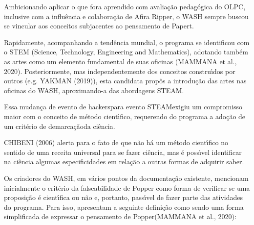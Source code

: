 \documentclass[
12pt,		%
openright,	%
twoside,  %
a4paper,			%
chapter=TITLE,		%
english,			%
french,				%
spanish,			%
brazil				%
]{USPSC-classe/USPSC}
\begin{document}
Ambicionando aplicar o que fora aprendido com avalia\c{c}\~ao pedag\'ogica do OLPC, inclusive com a influ\^encia e colabora\c{c}\~ao de Afira Ripper, o WASH sempre buscou se vincular aos conceitos subjacentes ao pensamento de Papert.









Rapidamente, acompanhando a tend\^encia mundial, o programa se identificou com o STEM (Science, Technology, Engineering and Mathematics), adotando tamb\'em as artes como um elemento fundamental de suas oficinas  (MAMMANA et al., 2020). Posteriormente, mas independentemente dos conceitos constru\'{\i}dos por outros (e.g.  YAKMAN (2019)), esta candidata prop\^os a introdu\c{c}\~ao das artes nas oficinas do WASH, aproximando-a das abordagens STEAM.









Essa mudan\c{c}a de \textquotedbl evento de hackers\textquotedbl  para \textquotedbl evento STEAM\textquotedbl  exigiu um compromisso maior com o conceito de m\'etodo cient\'{\i}fico, requerendo do programa a ado\c{c}\~ao de um \textquotedbl crit\'erio de demarca\c{c}\~ao\textquotedbl  da ci\^encia.









 CHIBENI (2006) alerta para o fato de que \textquotedbl n\~ao h\'a um m\'etodo cient\'{\i}fico no sentido de uma receita universal para se fazer ci\^encia\textquotedbl , mas \'e poss\'{\i}vel identificar na ci\^encia algumas especificidades em rela\c{c}\~ao a outras formas de adquirir saber.









Os criadores do WASH, em v\'arios pontos da documenta\c{c}\~ao existente, mencionam inicialmente o crit\'erio da falseabilidade de Popper como forma de verificar se uma proposi\c{c}\~ao \'e cient\'{\i}fica ou n\~ao e, portanto, pass\'{\i}vel de fazer parte das atividades do programa. Para isso, apresentam a seguinte defini\c{c}\~ao como sendo uma \textquotedbl forma simplificada de expressar o pensamento de Popper\textquotedbl   (MAMMANA et al., 2020):
\end{document}
